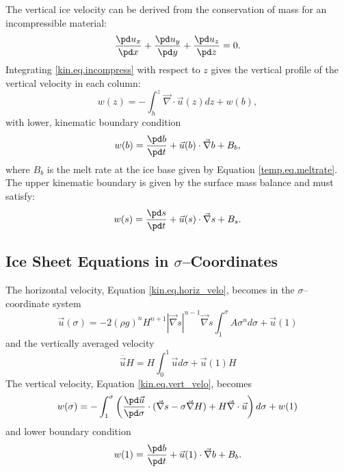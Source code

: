 The vertical ice velocity can be derived from the conservation of mass for an incompressible material:
\begin{equation}
  \label{kin.eq.incompress}
  \frac{\pd u_x}{\pd x} + \frac{\pd u_y}{\pd y} + \frac{\pd u_z}{\pd z} = 0.
\end{equation}
Integrating \eqref{kin.eq.incompress} with respect to $z$ gives the vertical profile of the vertical velocity in each column:
\begin{equation}
  \label{kin.eq.vert_velo}
  w(z)=-\int_h^z\vec\nabla\cdot\vec u(z)dz+w(b),
\end{equation}
with lower, kinematic boundary condition
\begin{equation}
  w(b)=\frac{\pd b}{\pd t}+\vec u(b)\cdot\vec\nabla b+B_b,
\end{equation}
where $B_b$ is the melt rate at the ice base given by Equation \eqref{temp.eq.meltrate}. The upper kinematic boundary is given by the surface mass balance and must satisfy:
\begin{equation}
  \label{kin.eq.upper_bc}
  w(s)=\frac{\pd s}{\pd t}+\vec u(s)\cdot\vec\nabla s+B_s.
\end{equation}



\subsection{Ice Sheet Equations in $\sigma$--Coordinates}
The horizontal velocity, Equation \eqref{kin.eq.horiz_velo}, becomes in the $\sigma$--coordinate system
\begin{equation}
  \label{kin.eq.vert_velo_sigma}
  \vec u(\sigma) = -2(\rho g)^nH^{n+1}|\vec\nabla s|^{n-1}\vec\nabla s\int_1^\sigma A\sigma^nd\sigma+\vec u(1)
\end{equation}
and the vertically averaged velocity
\begin{equation}
  \label{kin.eq.avg_velo_scaled}
  \overline{\vec u} H=H\int_0^1\vec ud\sigma+\vec u(1)H
\end{equation}
The vertical velocity, Equation \eqref{kin.eq.vert_velo}, becomes
\begin{equation}
  \label{kin.eq.vert_velo_scaled}
  w(\sigma)=-\int_1^\sigma\left(\frac{\pd\vec u}{\pd\sigma}\cdot(\vec\nabla s-\sigma\vec\nabla H)+H\vec\nabla\cdot\vec u\right)d\sigma+w(1)
\end{equation}
and lower boundary condition
\begin{equation}
  w(1)=\frac{\pd b}{\pd t}+\vec u(1)\cdot\vec\nabla b+B_b.
\end{equation}

